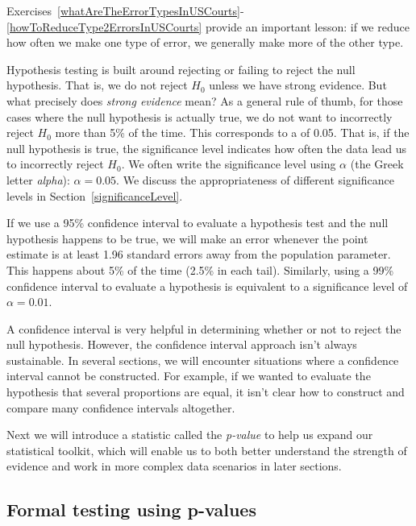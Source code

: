 Exercises~\ref{whatAreTheErrorTypesInUSCourts}-\ref{howToReduceType2ErrorsInUSCourts} provide
an important lesson: if we reduce how often we make
 one type of error, we generally make more of the
 other type.

Hypothesis testing is built around rejecting or failing
to reject the null hypothesis.
That is, we do not reject $H_0$ unless we have strong evidence.
But what precisely does \emph{strong evidence} mean?
As a general rule of thumb, for those cases where the null
hypothesis is actually true, we do not want to incorrectly
reject $H_0$ more than 5\% of the time.
This corresponds to a %
 of 0.05.
That is, if the null hypothesis is true,
the significance level indicates how often
the data lead us to incorrectly reject $H_0$.
We often write the significance level using $\alpha$
(the Greek letter \emph{alpha}):
$\alpha = 0.05$.
We discuss the appropriateness of different significance
levels in Section~\ref{significanceLevel}.

If we use a 95\% confidence interval to evaluate a
hypothesis test and the null hypothesis happens to be true,
we will make an error whenever the point estimate is
at least 1.96 standard errors away from the population
parameter.
This happens about 5\% of the time (2.5\% in each tail).
Similarly, using a 99\% confidence interval to evaluate
a hypothesis is equivalent to a significance level of
$\alpha = 0.01$.

A confidence interval is very helpful in determining
whether or not to reject the null hypothesis.
However, the confidence interval approach isn't always
sustainable.
In several sections, we will encounter situations where
a confidence interval cannot be constructed.
For example, if we wanted to evaluate the hypothesis
that several proportions are equal, it isn't clear how
to construct and compare many confidence intervals
altogether.

Next we will introduce a statistic called the \emph{p-value}
to help us expand our statistical toolkit, which will
enable us to both better understand the strength of
evidence and work in more complex data scenarios in
later sections.



\subsection{Formal testing using p-values}

